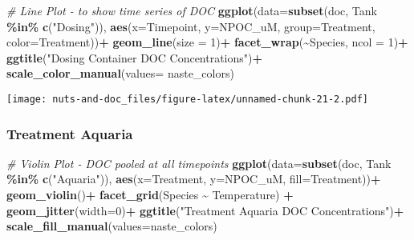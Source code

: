 \documentclass[
]{article}
\newenvironment{Shaded}{\begin{snugshade}}{\end{snugshade}}
\newcommand{\AttributeTok}[1]{\textcolor[rgb]{0.13,0.29,0.53}{#1}}
\newcommand{\CommentTok}[1]{\textcolor[rgb]{0.56,0.35,0.01}{\textit{#1}}}
\newcommand{\DecValTok}[1]{\textcolor[rgb]{0.00,0.00,0.81}{#1}}
\newcommand{\FunctionTok}[1]{\textcolor[rgb]{0.13,0.29,0.53}{\textbf{#1}}}
\newcommand{\NormalTok}[1]{#1}
\newcommand{\SpecialCharTok}[1]{\textcolor[rgb]{0.81,0.36,0.00}{\textbf{#1}}}
\newcommand{\StringTok}[1]{\textcolor[rgb]{0.31,0.60,0.02}{#1}}
\begin{document}
\begin{Shaded}
\begin{Highlighting}[]
\CommentTok{\# Line Plot {-} to show time series of DOC}
\FunctionTok{ggplot}\NormalTok{(}\AttributeTok{data=}\FunctionTok{subset}\NormalTok{(doc, Tank }\SpecialCharTok{\%in\%} \FunctionTok{c}\NormalTok{(}\StringTok{"Dosing"}\NormalTok{)), }\FunctionTok{aes}\NormalTok{(}\AttributeTok{x=}\NormalTok{Timepoint, }\AttributeTok{y=}\NormalTok{NPOC\_uM, }\AttributeTok{group=}\NormalTok{Treatment, }\AttributeTok{color=}\NormalTok{Treatment))}\SpecialCharTok{+}
  \FunctionTok{geom\_line}\NormalTok{(}\AttributeTok{size =} \DecValTok{1}\NormalTok{)}\SpecialCharTok{+}
  \FunctionTok{facet\_wrap}\NormalTok{(}\SpecialCharTok{\textasciitilde{}}\NormalTok{Species, }\AttributeTok{ncol =} \DecValTok{1}\NormalTok{)}\SpecialCharTok{+}
  \FunctionTok{ggtitle}\NormalTok{(}\StringTok{"Dosing Container DOC Concentrations"}\NormalTok{)}\SpecialCharTok{+}
  \FunctionTok{scale\_color\_manual}\NormalTok{(}\AttributeTok{values=}\NormalTok{ naste\_colors)}
\end{Highlighting}
\end{Shaded}

\texttt{[image: nuts-and-doc\_files/figure-latex/unnamed-chunk-21-2.pdf]}

\hypertarget{treatment-aquaria-6}{%
\subsubsection{Treatment Aquaria}\label{treatment-aquaria-6}}

\begin{Shaded}
\begin{Highlighting}[]
\CommentTok{\# Violin Plot {-} DOC pooled at all timepoints}
\FunctionTok{ggplot}\NormalTok{(}\AttributeTok{data=}\FunctionTok{subset}\NormalTok{(doc, Tank }\SpecialCharTok{\%in\%} \FunctionTok{c}\NormalTok{(}\StringTok{"Aquaria"}\NormalTok{)), }\FunctionTok{aes}\NormalTok{(}\AttributeTok{x=}\NormalTok{Treatment, }\AttributeTok{y=}\NormalTok{NPOC\_uM, }\AttributeTok{fill=}\NormalTok{Treatment))}\SpecialCharTok{+}
  \FunctionTok{geom\_violin}\NormalTok{()}\SpecialCharTok{+}
  \FunctionTok{facet\_grid}\NormalTok{(Species }\SpecialCharTok{\textasciitilde{}}\NormalTok{ Temperature) }\SpecialCharTok{+}
  \FunctionTok{geom\_jitter}\NormalTok{(}\AttributeTok{width=}\DecValTok{0}\NormalTok{)}\SpecialCharTok{+}
  \FunctionTok{ggtitle}\NormalTok{(}\StringTok{"Treatment Aquaria DOC Concentrations"}\NormalTok{)}\SpecialCharTok{+}
  \FunctionTok{scale\_fill\_manual}\NormalTok{(}\AttributeTok{values=}\NormalTok{naste\_colors)}
\end{Highlighting}
\end{Shaded}
\end{document}
